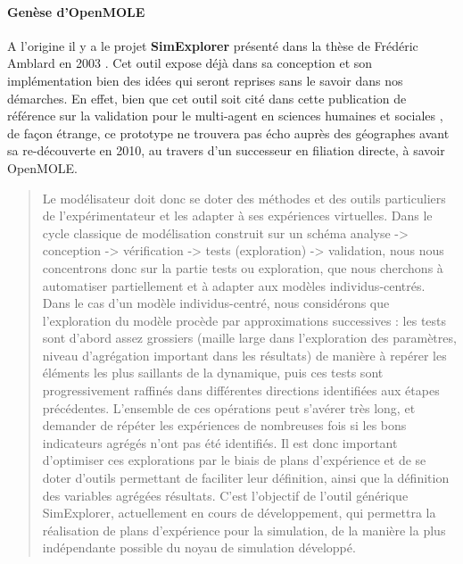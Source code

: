 \paragraph {Genèse d'OpenMOLE}

A l'origine il y a le projet \textbf{SimExplorer} présenté dans la thèse de  Frédéric Amblard en 2003 \autocite{Amblard2003}. Cet outil expose déjà dans sa conception et son implémentation bien des idées qui seront reprises sans le savoir dans nos démarches. En effet, bien que cet outil soit cité dans cette publication de référence sur la validation pour le multi-agent en sciences humaines et sociales \autocite{Amblard2006}, de façon étrange, ce prototype ne trouvera pas écho auprès des géographes avant sa re-découverte en 2010, au travers d'un successeur en filiation directe, à savoir OpenMOLE.

\blockquote[\cite{Amblard2002}]{Le modélisateur doit donc se doter des méthodes et des outils particuliers de l’expérimentateur et les adapter à ses expériences virtuelles. Dans le cycle classique de modélisation construit sur un schéma analyse -> conception -> vérification -> tests (exploration) -> validation, nous nous concentrons donc sur la partie tests ou exploration, que nous cherchons à automatiser partiellement et à adapter aux modèles individus-centrés. Dans le cas d’un modèle individus-centré, nous considérons que l’exploration du modèle procède par approximations successives : les tests sont d’abord assez grossiers (maille large dans l’exploration des paramètres, niveau d’agrégation important dans les résultats) de manière à repérer les éléments les plus saillants de la dynamique, puis ces tests sont progressivement raffinés dans différentes directions identifiées aux étapes précédentes. L’ensemble de ces opérations peut s’avérer très long, et demander de répéter les expériences de nombreuses fois si les bons indicateurs agrégés n’ont pas été identifiés. Il est donc important d’optimiser ces explorations par le biais de plans d’expérience et de se doter d’outils permettant de faciliter leur définition, ainsi que la définition des variables agrégées résultats. C’est l’objectif de l’outil générique SimExplorer, actuellement en cours de développement, qui permettra la réalisation de plans d’expérience pour la simulation, de la manière la plus indépendante possible du noyau de simulation développé.}

